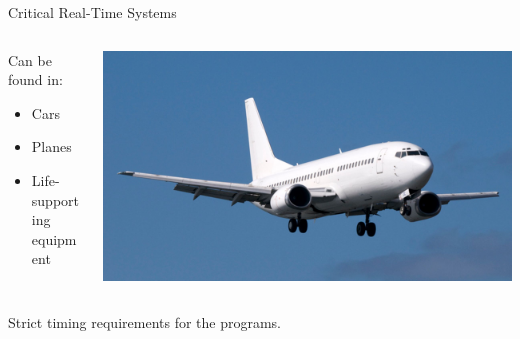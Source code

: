 \documentclass{beamer}
\begin{document}
\begin{frame}{Critical Real-Time Systems}
    \begin{columns}
        \begin{column}{0.5\textwidth}
            \begin{block}{Can be found in:}
                \begin{itemize}
                    \item Cars 
                    \item Planes
                    \item Life-supporting equipment
                \end{itemize}
            \end{block}
        \end{column}

        \begin{column}{0.5\textwidth}
            \includegraphics[width=\textwidth]{pic/plane.png}
        \end{column}
    \end{columns}

    \hfill \break
    \hfill \break

    Strict timing requirements for the programs.
    
\end{frame}

\end{document}
